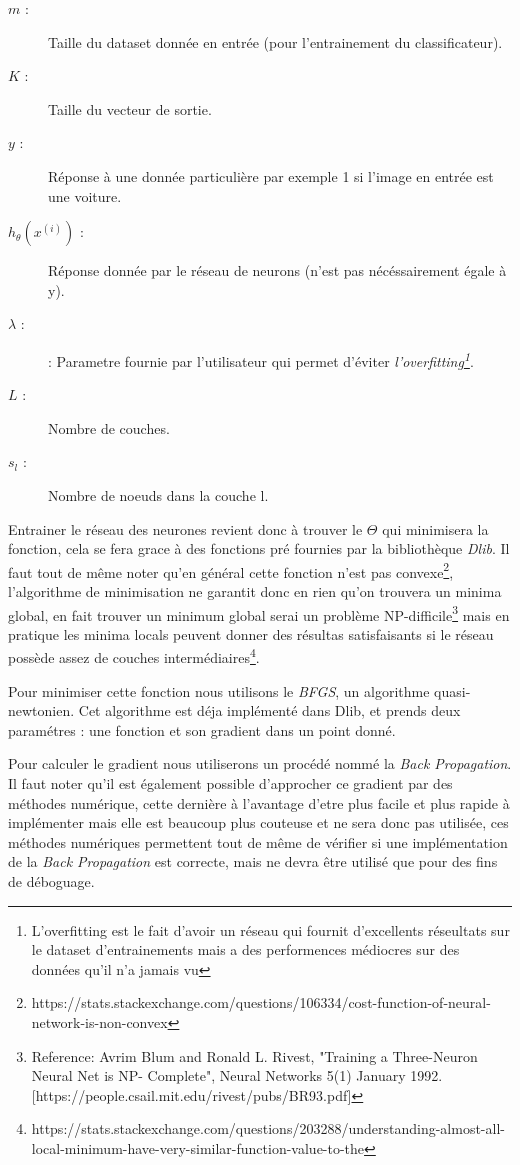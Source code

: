 \begin{description}

\item[$m$ : ] Taille du dataset donnée en entrée (pour l'entrainement du classificateur).
\item[$K$ : ] Taille du vecteur de sortie.
\item[$y$ : ] Réponse à une donnée particulière par exemple 1 si l'image en entrée est une voiture.
\item[$h_\theta(x^{(i)})$ : ] Réponse donnée par le réseau de neurons (n'est pas nécéssairement égale à y).
\item[$\lambda$ : ] : Parametre fournie par l'utilisateur qui permet d'éviter \textit{l'overfitting\footnote{L'overfitting est le fait d'avoir un réseau qui fournit d'excellents réseultats sur le dataset d'entrainements mais a des performences médiocres sur des données qu'il n'a jamais vu}}.
\item[$L$ : ] Nombre de couches.
\item[$s_l$ : ] Nombre de noeuds dans la couche l.

\end{description}

Entrainer le réseau des neurones revient donc à trouver le $\Theta$ qui minimisera la fonction, cela se fera grace à des fonctions pré fournies par la bibliothèque \textit{Dlib}.
Il faut tout de même noter qu'en général cette fonction n'est pas convexe\footnote{https://stats.stackexchange.com/questions/106334/cost-function-of-neural-network-is-non-convex}, l'algorithme de minimisation ne garantit donc en rien qu'on trouvera un minima global, en fait trouver un minimum global serai un problème NP-difficile\footnote{Reference: Avrim Blum and Ronald L. Rivest, "Training a Three-Neuron Neural Net is NP- Complete", Neural Networks 5(1) January 1992. [https://people.csail.mit.edu/rivest/pubs/BR93.pdf]} mais en pratique les minima locals peuvent donner des résultas satisfaisants si le réseau possède assez de couches intermédiaires\footnote{https://stats.stackexchange.com/questions/203288/understanding-almost-all-local-minimum-have-very-similar-function-value-to-the}.

Pour minimiser cette fonction nous utilisons le \textit{BFGS}, un algorithme quasi-newtonien\cite{analyse}. Cet algorithme est déja implémenté dans Dlib, et prends deux paramétres : une fonction et son gradient dans un point donné.

Pour calculer le gradient nous utiliserons un procédé nommé la \textit{Back Propagation}. Il faut noter qu'il est également possible d'approcher ce gradient par des méthodes numérique, cette dernière à l'avantage d'etre plus facile et plus rapide à implémenter mais elle est beaucoup plus couteuse et ne sera donc pas utilisée, ces méthodes numériques permettent tout de même de vérifier si une implémentation de la \textit{Back Propagation} est correcte, mais ne devra être utilisé que pour des fins de déboguage.

